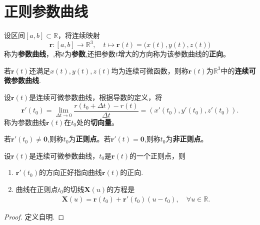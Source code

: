 \documentclass[../../main.tex]{subfiles}%
\begin{document}
\section{正则参数曲线}

\begin{definition}[参数曲线]
设区间$[a,b]\subset \mathbb{R}$，将连续映射
\[
\bm{r}: [a,b] \to \mathbb{R}^3,\quad t\mapsto \bm{r}(t)=\big(x(t),y(t),z(t)\big)
\]
称为\textbf{参数曲线}，,称$t$为\textbf{参数},还把参数$t$增大的方向称为该参数曲线的\textbf{正向}。

若$\bm{r}(t)$还满足$x(t),y(t),z(t)$均为连续可微函数，则称$\bm{r}(t)$为$\mathbb{R}^3$中的\textbf{连续可微参数曲线}.
\end{definition}

\begin{definition}[切向量与正则点]
设$\bm{r}(t)$是连续可微参数曲线，根据导数的定义，将
\[
\bm{r}'(t_0) =\lim_{\Delta t\rightarrow 0} \frac{r\left( t_0+\Delta t \right) -r\left( t \right)}{\Delta t} = \left(x'(t_0),y'(t_0),z'(t_0)\right).
\]
称为参数曲线$\bm{r}(t)$在$t_0$处的\textbf{切向量}。

若$\bm{r}'(t_0)\neq \bm{0}$,则称$t_0$为\textbf{正则点}。若$\bm{r}'(t)=\bm{0}$,则称$t_0$为\textbf{非正则点}。

\end{definition}

\begin{proposition}
设$\bm{r}(t)$是连续可微参数曲线，$t_0$是$\bm{r}(t)$的一个正则点，则
\begin{enumerate}[(1)]
\item $\bm{r}'(t_0)$的方向正好指向曲线$\bm{r}(t)$的正向.

\item 曲线在正则点$t_0$的切线$\boldsymbol{X}\left( u \right)$的方程是
\begin{align*}
\boldsymbol{X}\left( u \right) =\bm{r}\left( t_0 \right) +\bm{r}'\left( t_0 \right)(u-t_0) ,\quad \forall u\in \mathbb{R} .
\end{align*}
\end{enumerate}
\end{proposition}
\begin{proof}

定义自明.

\end{proof}
\end{document}
